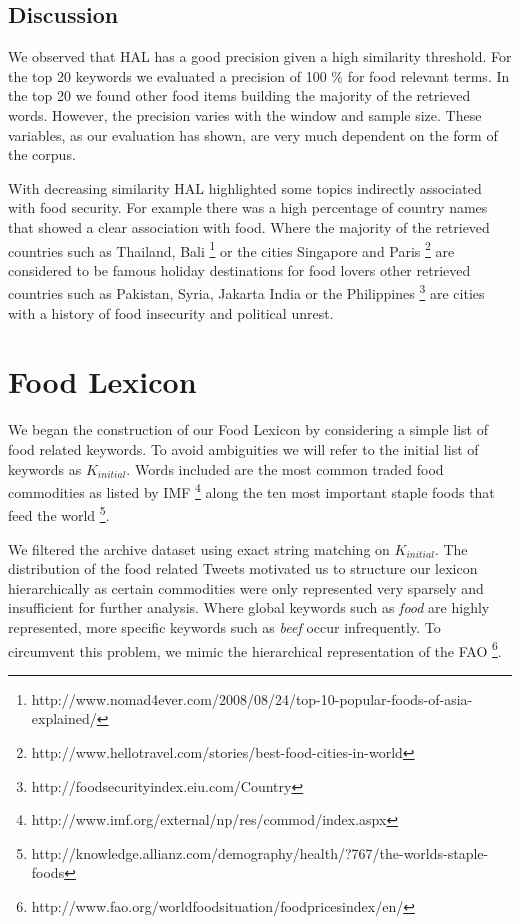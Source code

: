 
\subsection{Discussion}

We observed that HAL has a good precision given a high similarity threshold. For the top 20 keywords we evaluated a precision of 100 \% for food relevant terms. In the top 20 we found other food items building the majority of the retrieved words. However, the precision varies with the window and sample size. These variables, as our evaluation has shown, are very much dependent on the form of the corpus.  

With decreasing similarity HAL highlighted some topics indirectly associated with food security. For example there was a high percentage of country names that showed a clear association with food. Where the majority of the retrieved countries such as Thailand, Bali \footnote{http://www.nomad4ever.com/2008/08/24/top-10-popular-foods-of-asia-explained/} or the cities Singapore and Paris \footnote{http://www.hellotravel.com/stories/best-food-cities-in-world} are considered to be famous holiday destinations for food lovers other retrieved countries such as Pakistan, Syria, Jakarta India or the Philippines \footnote{http://foodsecurityindex.eiu.com/Country} are cities with a history of food insecurity and political unrest. 





\section{Food Lexicon}
\label{food_lex}

We began the construction of our Food Lexicon by considering  a simple list of food related keywords. To avoid ambiguities we will refer to the initial list of keywords as $K_{initial}$. Words included are the most common traded food commodities as listed by IMF \footnote{http://www.imf.org/external/np/res/commod/index.aspx} along the ten most important staple foods that feed the world \footnote{http://knowledge.allianz.com/demography/health/?767/the-worlds-staple-foods}. 

We filtered the archive dataset using exact string matching on $K_{initial}$. The distribution of the food related Tweets motivated us to structure our lexicon hierarchically as certain commodities were only represented very sparsely and insufficient for further analysis. Where global keywords such as \emph{food} are highly represented, more specific keywords such as \emph{beef} occur infrequently. To circumvent this problem, we mimic the hierarchical representation of the FAO   \footnote{http://www.fao.org/worldfoodsituation/foodpricesindex/en/}. 

